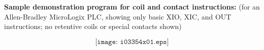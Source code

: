\vfil \eject

\noindent
{\bf Sample demonstration program for coil and contact instructions:} (for an Allen-Bradley MicroLogix PLC, showing only basic XIO, XIC, and OUT instructions; no retentive coils or special contacts shown)

$$\texttt{[image: i03354x01.eps]}$$





